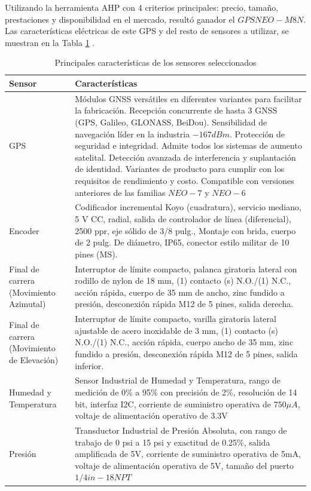 Utilizando la herramienta AHP con 4 criterios principales: precio, tamaño, prestaciones y disponibilidad en el mercado, resultó ganador el $ GPS NEO-M8N $.\\
	
Las características eléctricas de este GPS y del resto de sensores a utilizar, se muestran en la Tabla \ref{tabla:caracteristicas} \cite{DDC4}.

\begin{table}[H]
	\centering
	\caption{Principales características de los sensores seleccionados}
	\begin{tabular}{@{}|p{3cm}|p{10cm}|}
		\hline
		\textbf{Sensor} & \textbf{Características} \\
		\hline \hline
		GPS & Módulos GNSS versátiles en diferentes variantes para facilitar la fabricación. Recepción concurrente de hasta 3 GNSS (GPS, Galileo, GLONASS, BeiDou). Sensibilidad de navegación líder en la industria $ -167 dBm $. Protección de seguridad e integridad. Admite todos los sistemas de aumento satelital. Detección avanzada de interferencia y suplantación de identidad. Variantes de producto para cumplir con los requisitos de rendimiento y costo. Compatible con versiones anteriores de las familias $ NEO-7 $ y $ NEO-6 $ \\
		\hline
		Encoder & Codificador incremental Koyo (cuadratura), servicio mediano, 5 V CC, radial, salida de controlador de línea (diferencial), 2500 ppr, eje sólido de 3/8 pulg., Montaje con brida, cuerpo de 2 pulg. De diámetro, IP65, conector estilo militar de 10 pines (MS). \\
		\hline
		Final de carrera (Movimiento Azimutal) & Interruptor de límite compacto, palanca giratoria lateral con rodillo de nylon de 18 mm, (1) contacto (s) N.O./(1) N.C., acción rápida, cuerpo de 35 mm de ancho, zinc fundido a presión, desconexión rápida M12 de 5 pines, salida derecha. \\
		\hline
		Final de carrera (Movimiento de Elevación) & Interruptor de límite compacto, varilla giratoria lateral ajustable de acero inoxidable de 3 mm, (1) contacto (s) N.O./(1) N.C., acción rápida, cuerpo ancho de 35 mm, zinc fundido a presión, desconexión rápida M12 de 5 pines, salida inferior. \\
		\hline
		Humedad y Temperatura & Sensor Industrial de Humedad y Temperatura, rango de medición de 0\% a 95\% con precisión de 2\%, resolución de 14 bit, interfaz I2C, corriente de suministro operativa de $ 750 \mu A$, voltaje de alimentación operativo de 3.3V \\
		\hline
		Presión & Transductor Industrial de Presión Absoluta, con rango de trabajo de 0 psi a 15 psi y exactitud de 0.25\%, salida amplificada de 5V, corriente de suministro operativa de 5mA, voltaje de alimentación operativa de 5V, tamaño del puerto $ 1/4 in - 18 NPT $\\
		\hline
	\end{tabular}
	\label{tabla:caracteristicas}
\end{table}


